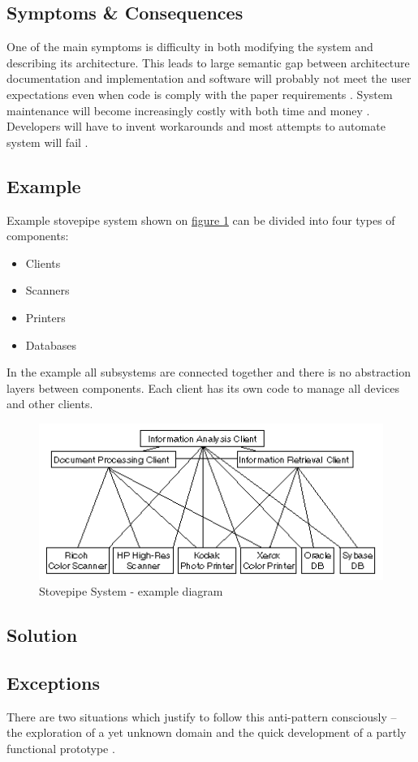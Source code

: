 \subsection{Symptoms \& Consequences}

One of the main symptoms is difficulty in both modifying the system and describing its architecture. This leads to large semantic gap between architecture documentation and implementation and software will probably not meet the user expectations even when code is comply with the paper requirements \cite{Virtual}. System maintenance will become increasingly costly with both time and money \cite{SurvivalGuide,Virtual,Solutions}. Developers will have to invent workarounds and most attempts to automate system will fail \cite{SurvivalGuide}.

\newpage
\subsection{Example}

Example stovepipe system shown on \hyperref[fig:StovepipeSystemExample]{figure \ref{fig:StovepipeSystemExample}} can be divided into four types of components:
\begin{itemize}
	\item Clients
	\item Scanners
	\item Printers
	\item Databases
\end{itemize}
In the example all subsystems are connected together and there is no abstraction layers between components. Each client has its own code to manage all devices and other clients.

\begin{figure}[!h]
    \centering
    \includegraphics[scale=1.3]{Images/ssexample.png}
    \caption[Stovepipe System Example]{Stovepipe System - example diagram \cite{ClientServer}}
    \label{fig:StovepipeSystemExample}
\end{figure}

\subsection{Solution}



\subsection{Exceptions}

There are two situations which justify to follow this anti-pattern consciously – the exploration
of a yet unknown domain and the quick development of a partly functional prototype \cite{Virtual}.